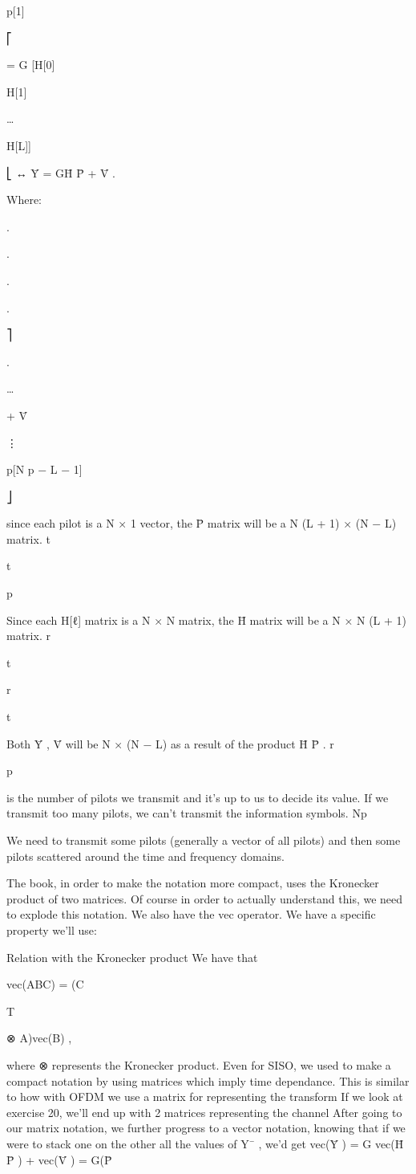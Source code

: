 {{{p[1]

⎡

= \sqrt G [H[0]

H[1]

…

H[L]]

⎣
↔ Ȳ = \sqrt GH̄ P̄ + V̄ .

Where:

.

.

.

.

⎤

.

…

+ V̄

⋮

p[N p − L − 1]

⎦

since each pilot is a N × 1 vector, the P̄ matrix will be a N (L + 1) × (N − L) matrix.
t

t

p

Since each H[ℓ] matrix is a N × N matrix, the H̄ matrix will be a N × N (L + 1)
matrix.
r

t

r

t

Both Ȳ , V̄ will be N × (N − L) as a result of the product H̄ P̄ .
r

p

is the number of pilots we transmit and it's up to us to decide its value.
If we transmit too many pilots, we can't transmit the information symbols.
Np

We need to transmit some pilots (generally a vector of all pilots) and then some pilots scattered around the time and frequency domains.

The book, in order to make the notation more compact, uses the Kronecker product of two matrices.
Of course in order to actually understand this, we need to explode this notation.
We also have the vec operator. We have a specific property we'll use:

Relation with the Kronecker product We have that

vec(ABC) = (C

T

⊗ A)vec(B) ,

where ⊗ represents the Kronecker product.
Even for SISO, we used to make a compact notation by using matrices which imply time dependance.
This is similar to how with OFDM we use a matrix for representing the transform If we look at exercise 20, we'll end up with 2 matrices representing the channel After going to our matrix notation, we further progress to a vector notation, knowing that if we were to stack one on the other all the values of Y¯ , we'd get vec(Ȳ ) = \sqrt G vec(H̄ P̄ ) + vec(V̄ )
= \sqrt G(P̄

}}}
